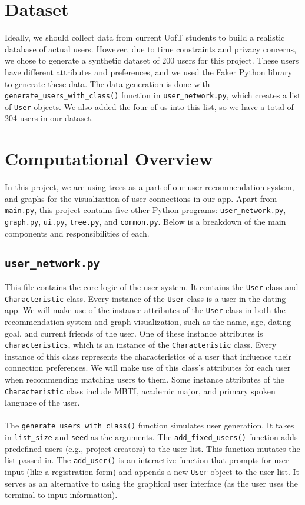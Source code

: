 \documentclass[fontsize=11pt]{article}
\begin{document}
\section{Dataset}
Ideally, we should collect data from current UofT students to build a realistic database of actual users.
However, due to time constraints and privacy concerns, we chose to generate a synthetic dataset of 200 users for this project.
These users have different attributes and preferences, and we used the Faker Python library to generate these data.
The data generation is done with \texttt{generate\_users\_with\_class()} function in \texttt{user\_network.py}, which creates a list of \texttt{User} objects.
We also added the four of us into this list, so we have a total of 204 users in our dataset.

\section{Computational Overview}
In this project, we are using trees as a part of our user recommendation system, and graphs for the visualization of user connections in our app.
Apart from \texttt{main.py}, this project contains five other Python programs: \texttt{user\_network.py}, \texttt{graph.py}, \texttt{ui.py}, \texttt{tree.py}, and \texttt{common.py}. Below is a breakdown of the main components and responsibilities of each.

\subsection*{\texttt{user\_network.py}}
This file contains the core logic of the user system.
It contains the \texttt{User} class and \texttt{Characteristic} class.
Every instance of the \texttt{User} class is a user in the dating app.
We will make use of the instance attributes of the \texttt{User} class in both the recommendation system and graph visualization, such as the name, age, dating goal, and current friends of the user.
One of these instance attributes is \texttt{characteristics}, which is an instance of the \texttt{Characteristic} class.
Every instance of this class represents the characteristics of a user that influence their connection preferences.
We will make use of this class's attributes for each user when recommending matching users to them.
Some instance attributes of the \texttt{Characteristic} class include MBTI, academic major, and primary spoken language of the user.
\\
\\
The \texttt{generate\_users\_with\_class()} function simulates user generation.
It takes in \texttt{list\_size} and \texttt{seed} as the arguments.
The \texttt{add\_fixed\_users()} function adds predefined users (e.g., project creators) to the user list. This function mutates the list passed in.
The \texttt{add\_user()} is an interactive function that prompts for user input (like a registration form) and appends a new \texttt{User} object to the user list. It serves as an alternative to using the graphical user interface (as the user uses the terminal to input information).
\end{document}
